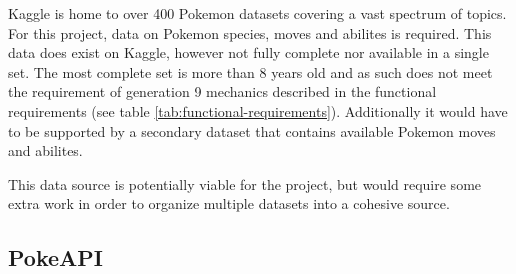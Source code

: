 Kaggle is home to over 400 Pokemon datasets \cite{PokemonKaggleDataSets} covering a vast spectrum of topics. For this project, data on Pokemon species,
moves and abilites is required. This data does exist on Kaggle, however not fully complete nor available in a single set. The most complete set \cite{PokemonDataSetWithStats} is 
more than 8 years old and as such does not meet the requirement of generation 9 mechanics described in the functional requirements (see table \ref{tab:functional-requirements}).
Additionally it would have to be supported by a secondary dataset that contains available Pokemon moves and abilites.

This data source is potentially viable for the project, but would require some extra work in order to organize multiple datasets into a cohesive source.

\subsection{PokeAPI}

